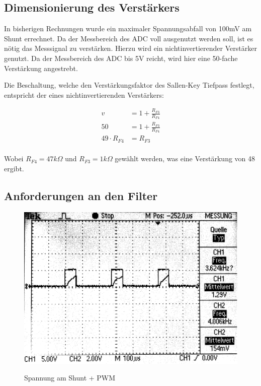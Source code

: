 \subsection{Dimensionierung des Verstärkers}

In bisherigen Rechnungen wurde ein maximaler Spannungsabfall von 100mV am Shunt errechnet. Da der Messbereich des ADC voll ausgenutzt werden soll,
ist es nötig das Messsignal zu verstärken. Hierzu wird ein nichtinvertierender Verstärker genutzt. Da der Messbereich des ADC bis 5V reicht, wird hier eine 
50-fache Verstärkung angestrebt.

Die Beschaltung, welche den Verstärkungsfaktor des Sallen-Key Tiefpass festlegt, entspricht der eines nichtinvertierenden Verstärkers:

\begin{align*}
v &= 1 + \frac{R_{F3}}{R_{F4}}\\
50 &= 1 + \frac{R_{F3}}{R_{F4}}\\
49\cdot R_{F4} &= R_{F3}
\end{align*}
\\
Wobei $R_{F4} = 47 k\Omega$ und $R_{F3} = 1 k\Omega$  gewählt werden, was eine Verstärkung von 48 ergibt.


\subsection{Anforderungen an den Filter}

\begin{figure}[H]
\centering
\includegraphics[width=.8\textwidth]{oszi.png}\\
\caption{Spannung am Shunt + PWM}%
\label{fig:pwm+i}
\end{figure}

